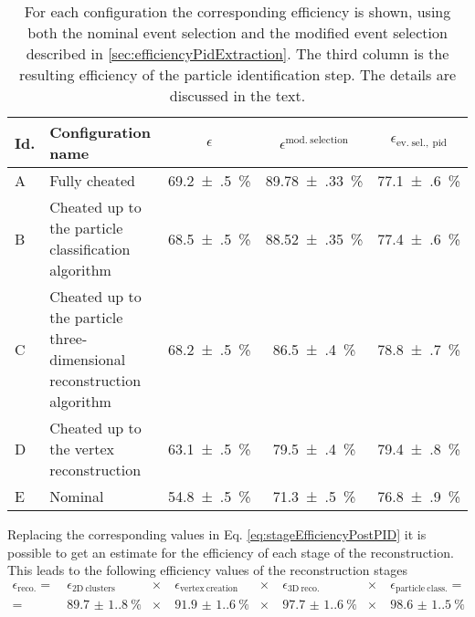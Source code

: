 \begin{table}[]
    \centering
    \caption[Particle identification efficiency for all configurations]{For each configuration the corresponding efficiency is shown, using both the nominal event selection and the modified event selection described in \autoref{sec:efficiencyPidExtraction}. The third column is the resulting efficiency of the particle identification step. The details are discussed in the text. }
    \label{tab:pidEfficiencyPerConfiguration}
    \begin{tabular}{lp{4cm}ccc}
        \hline
         Id. & Configuration name & $\epsilon$ & $\epsilon^\mathrm{mod.\ selection}$ & $\epsilon_\mathrm{ev.\ sel.,\ pid}$ \\
         \hline
         A & Fully cheated & \SI{69.2(5)}{\percent} & \SI{89.78(33)}{\percent} & \SI{77.1(6)}{\percent} \\
         B & Cheated up to the particle classification algorithm & \SI{68.5(5)}{\percent} & \SI{88.52(35)}{\percent} & \SI{77.4(6)}{\percent} \\
         C & Cheated up to the particle three-dimensional reconstruction algorithm & \SI{68.2(5)}{\percent} & \SI{86.5(4)}{\percent} & \SI{78.8(7)}{\percent} \\
         D & Cheated up to the vertex reconstruction & \SI{63.1(5)}{\percent} & \SI{79.5(4)}{\percent} & \SI{79.4(8)}{\percent} \\
         E & Nominal & \SI{54.8(5)}{\percent} & \SI{71.3(5)}{\percent} & \SI{76.8(9)}{\percent} \\
         \hline
    \end{tabular}
\end{table}

Replacing the corresponding values in Eq. \eqref{eq:stageEfficiencyPostPID} it is possible to get an estimate for the efficiency of each stage of the reconstruction. This leads to the following efficiency values of the reconstruction stages \begin{equation}
    \begin{aligned}
        \epsilon_\mathrm{reco.} =&\
        \epsilon_\mathrm{2D\ clusters} &\times&\ 
        \epsilon_\mathrm{vertex\ creation} &\times&\ 
        \epsilon_\mathrm{3D\ reco.} &\times&\ 
        \epsilon_\mathrm{particle\ class.} =\\  
        =&\ \SI{89.7(1.8)}{\percent} &\times&\ 
        \SI{91.9(1.6)}{\percent} &\times&\ 
        \SI{97.7(1.6)}{\percent} &\times&\ 
        \SI{98.6(1.5)}{\percent}
    \end{aligned}
\end{equation}